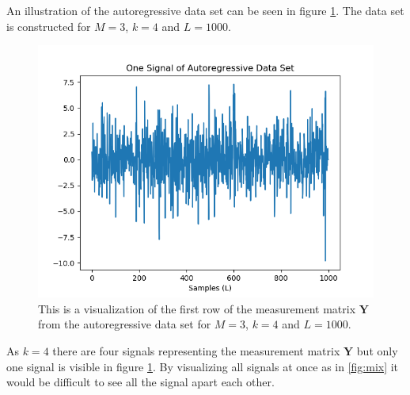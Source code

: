 An illustration of the autoregressive data set can be seen in figure \ref{fig:AR}. The data set is constructed for $M = 3$, $k = 4$ and $L = 1000$.
\begin{figure}[H]
\centering
\includegraphics[scale=0.5]{figures/chapter6/AR_Data_m3_n4_k4_L1000.png}
\caption{This is a visualization of the first row of the measurement matrix $\mathbf{Y}$ from the autoregressive data set for $M = 3$, $k=4$ and $L=1000$.}
\label{fig:AR}
\end{figure}
\noindent
As $k = 4$ there are four signals representing the measurement matrix $\mathbf{Y}$ but only one signal is visible in figure \ref{fig:AR}. By visualizing all signals at once as in \ref{fig:mix} it would be difficult to see all the signal apart each other.
